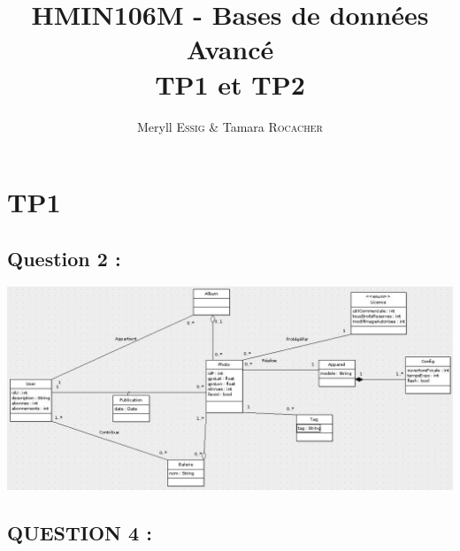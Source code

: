 \documentclass[10pt]{article}
\title{HMIN106M - Bases de données Avancé\\TP1 et TP2}
\author{Meryll \textsc{Essig} & Tamara \textsc{Rocacher}}
\begin{document}
\maketitle
\newpage
\section{TP1}
\subsection{Question 2 :}
  \begin{center}
    \includegraphics[scale=0.5]{umlTP1.png}
  \end{center}

\subsection{QUESTION 4 :}
  \subsubsection{}
\end{document}
